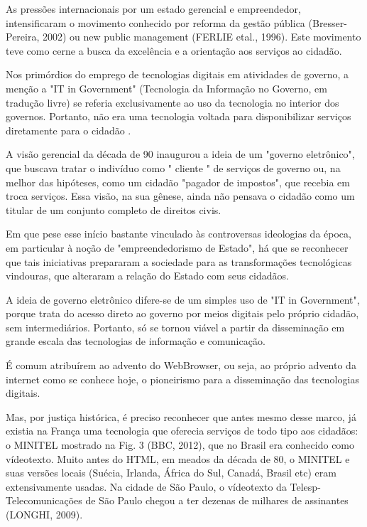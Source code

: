 As pressões internacionais por um estado gerencial e empreendedor, intensificaram o movimento conhecido por reforma da gestão pública (Bresser-Pereira, 2002) ou new public management (FERLIE etal., 1996). Este movimento teve como cerne a busca da excelência e a orientação aos serviços ao cidadão.

Nos primórdios do emprego de tecnologias digitais em atividades de governo, a menção a "IT in Government" (Tecnologia da Informação no Governo, em tradução livre) se referia exclusivamente ao uso da tecnologia no interior dos governos. Portanto, não era uma tecnologia voltada para disponibilizar serviços diretamente para o cidadão .

A visão gerencial da década de 90 inaugurou a ideia de um "governo eletrônico", que buscava tratar o indivíduo como " cliente " de serviços de governo ou, na melhor das hipóteses, como um cidadão "pagador de impostos", que recebia em troca serviços. Essa visão, na sua gênese, ainda não pensava o cidadão como um titular de um conjunto completo de direitos civis.

Em que pese esse início bastante vinculado às controversas ideologias da época, em particular à noção de "empreendedorismo de Estado", há que se reconhecer que tais iniciativas prepararam a sociedade para as transformações tecnológicas vindouras, que alteraram a relação do Estado com seus cidadãos.

A ideia de governo eletrônico difere-se de um simples uso de "IT in Government", porque trata do acesso direto ao governo por meios digitais pelo próprio cidadão, sem intermediários. Portanto, só se tornou viável a partir da disseminação em grande escala das tecnologias de informação e comunicação.

É comum atribuírem ao advento do WebBrowser, ou seja, ao próprio advento da internet como se conhece hoje, o pioneirismo para a disseminação das tecnologias digitais.

Mas, por justiça histórica, é preciso reconhecer que antes mesmo desse marco, já existia na França uma tecnologia que oferecia serviços de todo tipo aos cidadãos: o MINITEL mostrado na Fig. 3 (BBC, 2012), que no Brasil era conhecido como vídeotexto. Muito antes do HTML, em meados da década de 80, o MINITEL e suas versões locais (Suécia, Irlanda, África do Sul, Canadá, Brasil etc) eram extensivamente usadas. Na cidade de São Paulo, o vídeotexto da Telesp- Telecomunicações de São Paulo chegou a ter dezenas de milhares de assinantes (LONGHI, 2009).



